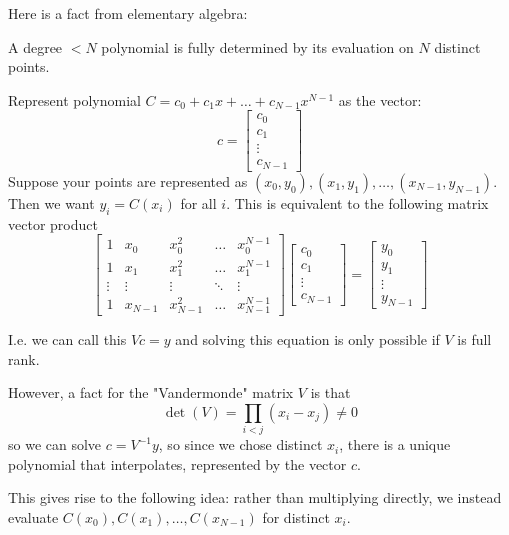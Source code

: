 Here is a fact from elementary algebra:
\begin{note} 
    A degree $< N$ polynomial is fully determined by its evaluation on $N$ distinct points.

    \begin{proof*}
    Represent polynomial $C = c_0 + c_1 x + \dots + c_{N - 1} x^{N - 1}$ as the vector:
    \[ c = \begin{bmatrix} 
        c_0 \\ c_1 \\ \vdots \\ c_{N - 1}
    \end{bmatrix} \]
    Suppose your points are represented as $(x_0, y_0), (x_1, y_1), \dots, (x_{N-1}, y_{N - 1})$.
    Then we want $y_i = C(x_i)$ for all $i$. This is equivalent to the following matrix vector product
    \[ \begin{bmatrix}
        1 & x_0 & x_0^2 & \dots & x_0^{N-1} \\
        1 & x_1 & x_1^2 & \dots & x_1^{N-1} \\
        \vdots & \vdots & \vdots & \ddots & \vdots \\
        1 & x_{N - 1} & x_{N-1}^2 & \dots & x_{N-1}^{N-1}
    \end{bmatrix} \begin{bmatrix}
        c_0 \\ c_1 \\ \vdots \\ c_{N - 1}
    \end{bmatrix} = \begin{bmatrix}
        y_0 \\ y_1 \\ \vdots \\ y_{N - 1}
    \end{bmatrix}
    \]

    I.e. we can call this $Vc = y$ and solving this equation is only possible if
    $V$ is full rank.

    However, a fact for the "Vandermonde" matrix $V$ is that
    \[ \det(V) = \prod_{i < j} (x_i - x_j) \neq 0 \]
    so we can solve $c = V^{-1} y$, so since we chose distinct $x_i$, there is a unique polynomial that interpolates, 
    represented by the vector $c$.
    \end{proof*}
\end{note}

This gives rise to the following idea: rather than multiplying directly,
we instead evaluate $C(x_0), C(x_1), \dots, C(x_{N - 1})$ for distinct $x_i$.

